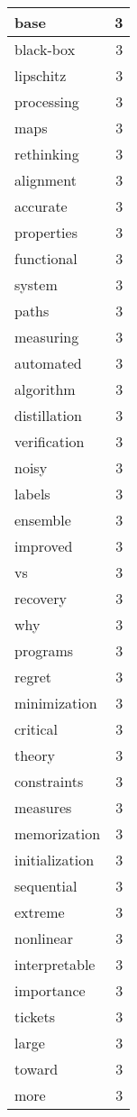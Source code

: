 \begin{table}[h]
\begin{tabular}{|l|r|}
\hline
base & 3 \\
\hline
black-box & 3 \\
\hline
lipschitz & 3 \\
\hline
processing & 3 \\
\hline
maps & 3 \\
\hline
rethinking & 3 \\
\hline
alignment & 3 \\
\hline
accurate & 3 \\
\hline
properties & 3 \\
\hline
functional & 3 \\
\hline
system & 3 \\
\hline
paths & 3 \\
\hline
measuring & 3 \\
\hline
automated & 3 \\
\hline
algorithm & 3 \\
\hline
distillation & 3 \\
\hline
verification & 3 \\
\hline
noisy & 3 \\
\hline
labels & 3 \\
\hline
ensemble & 3 \\
\hline
improved & 3 \\
\hline
vs & 3 \\
\hline
recovery & 3 \\
\hline
why & 3 \\
\hline
programs & 3 \\
\hline
regret & 3 \\
\hline
minimization & 3 \\
\hline
critical & 3 \\
\hline
theory & 3 \\
\hline
constraints & 3 \\
\hline
measures & 3 \\
\hline
memorization & 3 \\
\hline
initialization & 3 \\
\hline
sequential & 3 \\
\hline
extreme & 3 \\
\hline
nonlinear & 3 \\
\hline
interpretable & 3 \\
\hline
importance & 3 \\
\hline
tickets & 3 \\
\hline
large & 3 \\
\hline
toward & 3 \\
\hline
more & 3 \\

\end{tabular}
\end{table}
